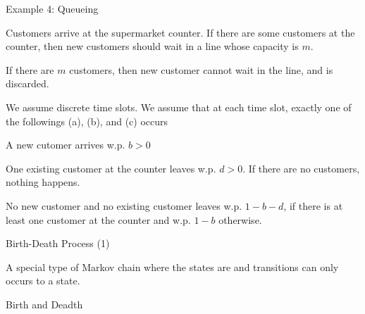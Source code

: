 \begin{frame}{Example 4: Queueing}

  {
    \small
    \plitemsep 0.03in
    \bci
    
  \item Customers arrive at the supermarket counter. If there are some
    customers at the counter, then new customers should wait in a line
    whose capacity is $m.$

  \item<2-> If there are $m$ customers, then new
    customer cannot wait in the line, and is discarded. 


  \item<3-> We assume discrete time slots. We assume that at each time
    slot,  exactly one of the followings (a), (b), and (c) occurs

    \eci
  }
  {
  \small
  \plitemsep 0.03in
  
    \bce[(a)]
  \item<4-> A new cutomer arrives w.p. $b >0$
  \item<5-> One existing customer at the counter leaves w.p. $d >0.$ If
    there are no customers, nothing happens.  
  \item<6-> No new customer and no existing customer leaves w.p. $1-b-d$,
    if there is at least one customer at the counter and w.p. $1-b$
    otherwise. 


    \ece
}

\vspace{-0.6cm}

\end{frame}

\begin{frame}{Birth-Death Process (1)}

  \plitemsep 0.07in
  \bci
  
\item<2-> A special type of Markov chain where the states are 
  and transitions can only occurs to a  state. 

\item<3-> Birth and Deadth
  
  \eci
  
\vspace{-0.5cm}
\end{frame}

